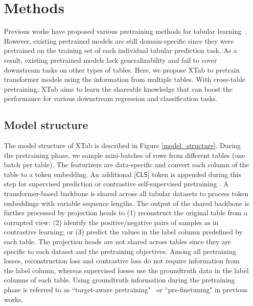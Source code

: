 \section{Methods} 
Previous works have proposed various pretraining methods for tabular learning~\citep{bahri2021scarf, ucar2021subtab, rubachev2022revisiting, somepalli2021saint}. However, existing pretrained models are still domain-specific since they were pretrained on the training set of each individual tabular prediction task. As a result, existing pretrained models lack generalizability and fail to cover downstream tasks on other types of tables. Here, we propose XTab to pretrain transformer models using the information from multiple tables. With cross-table pretraining, XTab aims to learn the shareable knowledge that can boost the performance for various downstream regression and classification tasks.

\subsection{Model structure} The model structure of XTab is described in Figure \ref{model_structure}. During the pretraining phase, we sample mini-batches of rows from different tables (one batch per table). The featurizers are data-specific and convert each column of the table to a token embedding. An additional $\textsf{[CLS]}$ token is appended during this step for supervised prediction or contrastive self-supervised pretraining \citep{wang2022transtab}. A transformer-based backbone is shared across all tabular datasets to process token embeddings with variable sequence lengths. The output of the shared backbone is further processed by projection heads to (1) reconstruct the original table from a corrupted view; (2) identify the positive/negative pairs of samples as in contrastive learning; or (3) predict the values in the label column predefined by each table. The projection heads are not shared across tables since they are specific to each dataset and the pretraining objectives. Among all  pretraining losses, reconstruction loss and contrastive loss do not require information from the label column, whereas supervised losses use the groundtruth data in the label columns of each table. Using groundtruth information during the pretraining phase is referred to as ``target-aware pretraining"~\citep{rubachev2022revisiting, wang2022transtab} or ``pre-finetuning" \citep{aghajanyan2021muppet} in previous works.

